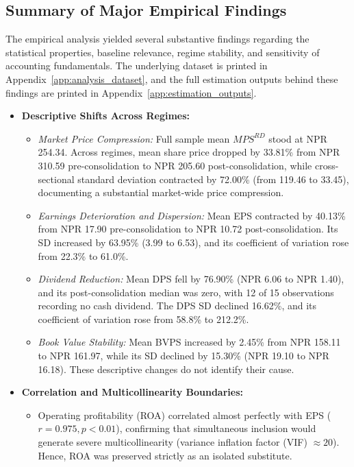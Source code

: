 \subsection{Summary of Major Empirical Findings}
The empirical analysis yielded several substantive findings regarding the statistical properties, baseline relevance, regime stability, and sensitivity of accounting fundamentals. The underlying dataset is printed in Appendix~\ref{app:analysis_dataset}, and the full estimation outputs behind these findings are printed in Appendix~\ref{app:estimation_outputs}.
\begin{itemize}
    \item \textbf{Descriptive Shifts Across Regimes:}
    \begin{itemize}
        \item \textit{Market Price Compression:} Full sample mean $\mathit{MPS}^{RD}$ stood at NPR 254.34. Across regimes, mean share price dropped by 33.81\% from NPR 310.59 pre-consolidation to NPR 205.60 post-consolidation, while cross-sectional standard deviation contracted by 72.00\% (from 119.46 to 33.45), documenting a substantial market-wide price compression.
        \item \textit{Earnings Deterioration and Dispersion:} Mean EPS contracted by 40.13\% from NPR 17.90 pre-consolidation to NPR 10.72 post-consolidation. Its SD increased by 63.95\% (3.99 to 6.53), and its coefficient of variation rose from 22.3\% to 61.0\%.
        \item \textit{Dividend Reduction:} Mean DPS fell by 76.90\% (NPR 6.06 to NPR 1.40), and its post-consolidation median was zero, with 12 of 15 observations recording no cash dividend. The DPS SD declined 16.62\%, and its coefficient of variation rose from 58.8\% to 212.2\%.
        \item \textit{Book Value Stability:} Mean BVPS increased by 2.45\% from NPR 158.11 to NPR 161.97, while its SD declined by 15.30\% (NPR 19.10 to NPR 16.18). These descriptive changes do not identify their cause.
    \end{itemize}
    \item \textbf{Correlation and Multicollinearity Boundaries:}
    \begin{itemize}
        \item Operating profitability (ROA) correlated almost perfectly with EPS ($r = 0.975, p < 0.01$), confirming that simultaneous inclusion would generate severe multicollinearity (variance inflation factor (VIF) $\approx 20$). Hence, ROA was preserved strictly as an isolated substitute.

\end{itemize}
\end{itemize}

